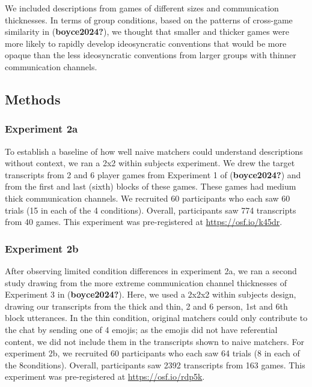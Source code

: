 \documentclass[10pt, letterpaper]{article}
\begin{document}
We included descriptions from games of different sizes and communication
thicknesses. In terms of group conditions, based on the patterns of
cross-game similarity in (\textbf{boyce2024?}), we thought that smaller
and thicker games were more likely to rapidly develop ideosyncratic
conventions that would be more opaque than the less ideosyncratic
conventions from larger groups with thinner communication channels.

\subsection{Methods}\label{methods}

\subsubsection{Experiment 2a}\label{experiment-2a}

To establish a baseline of how well naive matchers could understand
descriptions without context, we ran a 2x2 within subjects experiment.
We drew the target transcripts from 2 and 6 player games from Experiment
1 of (\textbf{boyce2024?}) and from the first and last (sixth) blocks of
these games. These games had medium thick communication channels. We
recruited 60 participants who each saw 60 trials (15 in each of the 4
conditions). Overall, participants saw 774 transcripts from 40 games.
This experiment was pre-registered at \url{https://osf.io/k45dr}.

\subsubsection{Experiment 2b}\label{experiment-2b}

After observing limited condition differences in experiment 2a, we ran a
second study drawing from the more extreme communication channel
thicknesses of Experiment 3 in (\textbf{boyce2024?}). Here, we used a
2x2x2 within subjects design, drawing our transcripts from the thick and
thin, 2 and 6 person, 1st and 6th block utterances. In the thin
condition, original matchers could only contribute to the chat by
sending one of 4 emojis; as the emojis did not have referential content,
we did not include them in the transcripts shown to naive matchers. For
experiment 2b, we recruited 60 participants who each saw 64 trials (8 in
each of the 8conditions). Overall, participants saw 2392 transcripts
from 163 games. This experiment was pre-registered at
\url{https://osf.io/rdp5k}.
\end{document}
